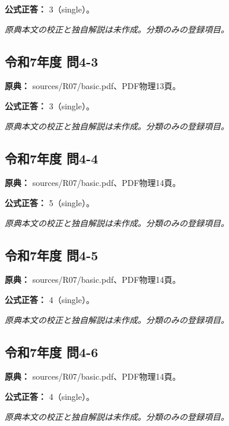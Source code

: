 \textbf{公式正答：} 3（single）。

\par\textit{原典本文の校正と独自解説は未作成。分類のみの登録項目。}

\subsection{令和7年度 問4-3}
\label{q:r07-reg-basic-4-3}

\noindent\textbf{原典：} sources/R07/basic.pdf、PDF物理13頁。

\textbf{公式正答：} 3（single）。

\par\textit{原典本文の校正と独自解説は未作成。分類のみの登録項目。}

\subsection{令和7年度 問4-4}
\label{q:r07-reg-basic-4-4}

\noindent\textbf{原典：} sources/R07/basic.pdf、PDF物理14頁。

\textbf{公式正答：} 5（single）。

\par\textit{原典本文の校正と独自解説は未作成。分類のみの登録項目。}

\subsection{令和7年度 問4-5}
\label{q:r07-reg-basic-4-5}

\noindent\textbf{原典：} sources/R07/basic.pdf、PDF物理14頁。

\textbf{公式正答：} 4（single）。

\par\textit{原典本文の校正と独自解説は未作成。分類のみの登録項目。}

\subsection{令和7年度 問4-6}
\label{q:r07-reg-basic-4-6}

\noindent\textbf{原典：} sources/R07/basic.pdf、PDF物理14頁。

\textbf{公式正答：} 4（single）。

\par\textit{原典本文の校正と独自解説は未作成。分類のみの登録項目。}
